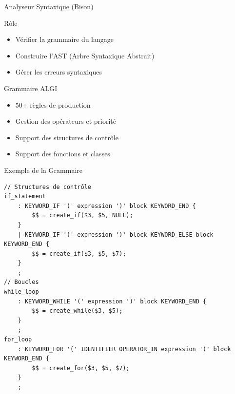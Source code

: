 \documentclass[10pt]{beamer}
\begin{document}
\begin{frame}{Analyseur Syntaxique (Bison)}
    \begin{block}{Rôle}
        \begin{itemize}
            \item Vérifier la grammaire du langage
            \item Construire l'AST (Arbre Syntaxique Abstrait)
            \item Gérer les erreurs syntaxiques
        \end{itemize}
    \end{block}
    
    \begin{block}{Grammaire ALGI}
        \begin{itemize}
            \item 50+ règles de production
            \item Gestion des opérateurs et priorité
            \item Support des structures de contrôle
            \item Support des fonctions et classes
        \end{itemize}
    \end{block}
\end{frame}

\begin{frame}[fragile]{Exemple de la Grammaire}
    \begin{lstlisting}[style=algi-style, caption={Extrait de algi.y}]
// Structures de contrôle
if_statement
    : KEYWORD_IF '(' expression ')' block KEYWORD_END {
        $$ = create_if($3, $5, NULL);
    }
    | KEYWORD_IF '(' expression ')' block KEYWORD_ELSE block KEYWORD_END {
        $$ = create_if($3, $5, $7);
    }
    ;
// Boucles
while_loop
    : KEYWORD_WHILE '(' expression ')' block KEYWORD_END {
        $$ = create_while($3, $5);
    }
    ;
for_loop
    : KEYWORD_FOR '(' IDENTIFIER OPERATOR_IN expression ')' block KEYWORD_END {
        $$ = create_for($3, $5, $7);
    }
    ;
\end{lstlisting}
\end{frame}
\end{document}
